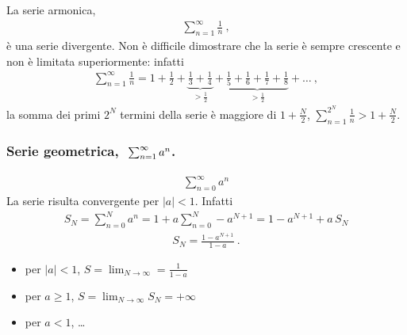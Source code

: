 \documentclass[letterpaper,10pt,italian]{jupyterBook}
\begin{document}
\sphinxAtStartPar
La serie armonica,
\begin{equation*}
\begin{split}\sum_{n=1}^{\infty} \frac{1}{n} \ ,\end{split}
\end{equation*}
\sphinxAtStartPar
è una serie divergente. Non è difficile dimostrare che la serie è sempre crescente e non è limitata superiormente: infatti
\begin{equation*}
\begin{split}\sum_{n=1}^{\infty} \frac{1}{n} = 1 + \frac{1}{2} + \underbrace{\frac{1}{3} + \frac{1}{4}}_{> \frac{1}{2}} + \underbrace{\frac{1}{5} + \frac{1}{6} + \frac{1}{7} + \frac{1}{8}}_{> \frac{1}{2}} + \dots \ ,\end{split}
\end{equation*}
\sphinxAtStartPar
la somma dei primi \(2^N\) termini della serie è maggiore di \(1 + \frac{N}{2}\), \(\sum_{n=1}^{2^N} \frac{1}{n} > 1 + \frac{N}{2}\).
\subsubsection*{Serie geometrica, \protect\(\ \sum_{n=1}^{\infty} a^n\protect\).}
\begin{equation*}
\begin{split}\sum_{n=0}^{\infty} a^n\end{split}
\end{equation*}
\sphinxAtStartPar
La serie risulta convergente per \(|a|<1\). Infatti
\begin{equation*}
\begin{split}S_N = \sum_{n=0}^{N} a^n = 1 + a \sum_{n=0}^{N} - a^{N+1} = 1 - a^{N+1} + a \, S_N\end{split}
\end{equation*}\begin{equation*}
\begin{split}S_N = \frac{1 - a^{N+1}}{1-a} \ .\end{split}
\end{equation*}\begin{itemize}
\item {} 
\sphinxAtStartPar
per \(|a| < 1\), \(S = \lim_{N \rightarrow \infty} = \frac{1}{1 - a}\)

\item {} 
\sphinxAtStartPar
per \(a \ge 1\), \(S = \lim_{N \rightarrow \infty} S_N = +\infty\)

\item {} 
\sphinxAtStartPar
per \(a<1\), …

\end{itemize}
\end{document}
